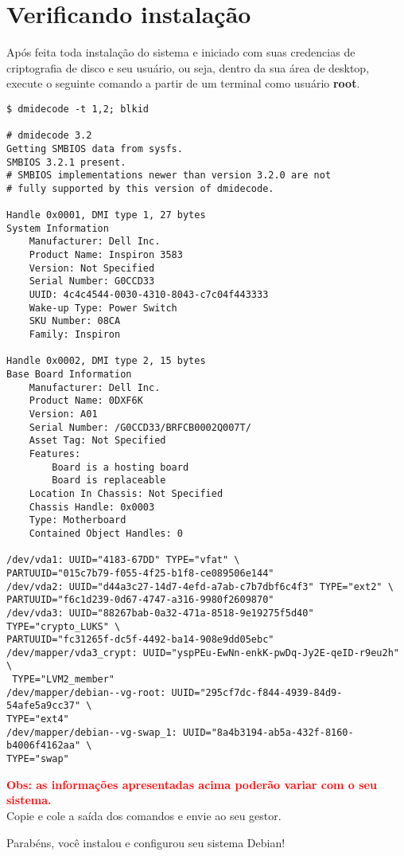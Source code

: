 \section{Verificando instalação} \label{sec:verify}
Após feita toda instalação do sistema e iniciado com suas credencias
de criptografia de disco e seu usuário, ou seja, dentro da sua área de
desktop, execute o seguinte comando a partir de um terminal como
usuário \textbf{root}.

\begin{verbatim}
$ dmidecode -t 1,2; blkid

# dmidecode 3.2
Getting SMBIOS data from sysfs.
SMBIOS 3.2.1 present.
# SMBIOS implementations newer than version 3.2.0 are not
# fully supported by this version of dmidecode.

Handle 0x0001, DMI type 1, 27 bytes
System Information
	Manufacturer: Dell Inc.
	Product Name: Inspiron 3583
	Version: Not Specified
	Serial Number: G0CCD33
	UUID: 4c4c4544-0030-4310-8043-c7c04f443333
	Wake-up Type: Power Switch
	SKU Number: 08CA
	Family: Inspiron

Handle 0x0002, DMI type 2, 15 bytes
Base Board Information
	Manufacturer: Dell Inc.
	Product Name: 0DXF6K
	Version: A01
	Serial Number: /G0CCD33/BRFCB0002Q007T/
	Asset Tag: Not Specified
	Features:
		Board is a hosting board
		Board is replaceable
	Location In Chassis: Not Specified
	Chassis Handle: 0x0003
	Type: Motherboard
	Contained Object Handles: 0

/dev/vda1: UUID="4183-67DD" TYPE="vfat" \
PARTUUID="015c7b79-f055-4f25-b1f8-ce089506e144"
/dev/vda2: UUID="d44a3c27-14d7-4efd-a7ab-c7b7dbf6c4f3" TYPE="ext2" \
PARTUUID="f6c1d239-0d67-4747-a316-9980f2609870"
/dev/vda3: UUID="88267bab-0a32-471a-8518-9e19275f5d40" TYPE="crypto_LUKS" \
PARTUUID="fc31265f-dc5f-4492-ba14-908e9dd05ebc"
/dev/mapper/vda3_crypt: UUID="yspPEu-EwNn-enkK-pwDq-Jy2E-qeID-r9eu2h" \
 TYPE="LVM2_member"
/dev/mapper/debian--vg-root: UUID="295cf7dc-f844-4939-84d9-54afe5a9cc37" \
TYPE="ext4"
/dev/mapper/debian--vg-swap_1: UUID="8a4b3194-ab5a-432f-8160-b4006f4162aa" \
TYPE="swap"
\end{verbatim}
 
\textcolor{red}{\textbf{Obs: as informações apresentadas acima poderão variar com o seu sistema.}}\\

Copie e cole a saída dos comandos e envie ao seu gestor.

Parabéns, você instalou e configurou seu sistema Debian!
